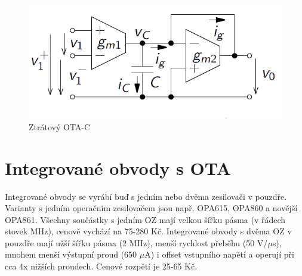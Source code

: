 \documentclass[twoside]{article}
\begin{document}
\begin{figure}[H]
\centering
\includegraphics[scale=0.5]{damp.png}
\caption{Ztrátový OTA-C \cite{4}}
\end{figure}
\section{Integrované obvody s OTA}
Integrované obvody se vyrábí buď s jedním nebo dvěma zesilovači v pouzdře. Varianty s jedním operačním zesilovačem jsou např. OPA615, OPA860 a novější OPA861. Všechny součástky s jedním OZ mají velkou šířku pásma (v řádech stovek MHz), cenově vychází na 75-280 Kč. Integrované obvody s dvěma OZ v pouzdře mají užší šířku pásma (2 MHz), menší rychlost přeběhu (50 V/$\mu$s), mnohem menší výstupní proud (650 $\mu$A) i offset vstupního napětí a operují při cca 4x nižších proudech. Cenové rozpětí je 25-65 Kč.
\renewcommand{\arraystretch}{1.5}
\begin{table}[H]
  \caption{\label{tab:Porovnání integrovaných obvodů s jedním OTA}orovnání integrovaných obvodů s jedním OTA \cite{5}}
  \end{table}
\end{document}
